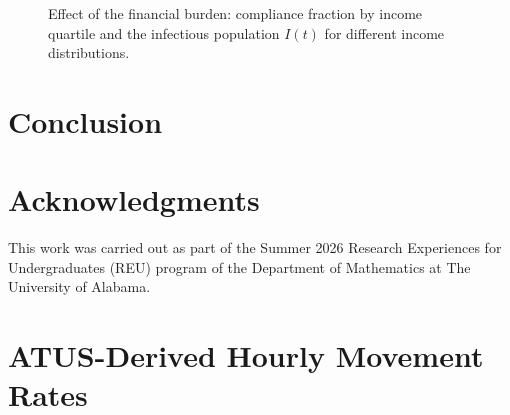 \documentclass[11pt]{article}
\theoremstyle{definition}
\theoremstyle{plain}
\begin{document}

\begin{figure}[H]
\centering
{}
\caption{Effect of the financial burden: compliance fraction by income quartile and the infectious population $I(t)$ for different income distributions.}
\label{fig:income}
\end{figure}


\section{Conclusion}
\label{sec:conclusion}


\section*{Acknowledgments}

This work was carried out as part of the Summer 2026 Research Experiences for Undergraduates (REU) program of the Department of Mathematics at The University of Alabama.
\appendix

\section{ATUS-Derived Hourly Movement Rates}
\label{app:atus}
\end{document}
